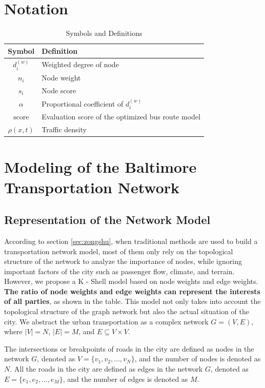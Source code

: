 \documentclass{mcmthesis}
\begin{document}
\section{Notation}

\begin{table}[H]
  \centering
  \caption{Symbols and Definitions}
  \label{tab:symbols}
  \begin{tabular}{cl}
    \toprule
    \textbf{Symbol}      & \textbf{Definition} \\
    \midrule
    $d_i^{(w)}$          & Weighted degree of node \\
    $n_i$                & Node weight \\
    $s_i$                & Node score \\
    $\alpha$             & Proportional coefficient of $d_i^{(w)}$ \\
    $\mathrm{score}$     & Evaluation score of the optimized bus route model \\
    $\rho(x,t)$          & Traffic density \\
    \bottomrule
  \end{tabular}
\end{table}

\section{Modeling of the Baltimore Transportation Network}

\subsection{Representation of the Network Model}

According to section \ref{sec:zongshu}, when traditional methods are used to build a transportation network model, most of them only rely on the topological structure of the network to analyze the importance of nodes, while ignoring important factors of the city such as passenger flow, climate, and terrain. However, we propose a K - Shell model based on node weights and edge weights. \textbf{The ratio of node weights and edge weights can represent the interests of all parties}, as shown in the table. This model not only takes into account the topological structure of the graph network but also the actual situation of the city. We abstract the urban transportation as a complex network \(G=(V, E)\), where \(|V| = N\), \(|E| = M\), and \(E\subseteq V\times V\).

The intersections or breakpoints of roads in the city are defined as nodes in the network \(G\), denoted as \(V=\{v_1, v_2, \ldots, v_N\}\), and the number of nodes is denoted as \(N\). All the roads in the city are defined as edges in the network \(G\), denoted as \(E = \{e_1, e_2, \ldots, e_M\}\), and the number of edges is denoted as \(M\).
\end{document}
